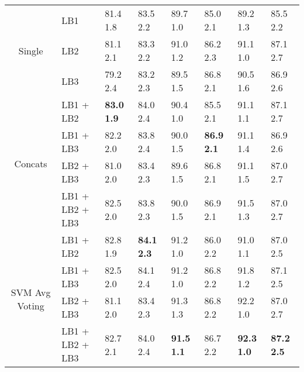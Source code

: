 \documentclass[10pt,journal,compsoc]{IEEEtran}
\begin{document}
\begin{table}[!b]
\begin{adjustbox}{width=\columnwidth}
\begin{tabular}{cl|ll|ll|ll|}
\multicolumn{1}{|c|}{\multirow{3}{*}{Single}}         & LB1             &  81.4  1.8	&83.5  2.2	&89.7  1.0	&85.0  2.1	&89.2  1.3	&85.5  2.2   \\
\multicolumn{1}{|c|}{}                                & LB2             &  81.1  2.1	&83.3  2.2	&91.0  1.2	&86.2  2.3	&91.1  1.0	&87.1  2.7   \\
\multicolumn{1}{|c|}{}                                & LB3             &  79.2  2.4	&83.2  2.3	&89.5  1.5	&86.8  2.1	&90.5  1.6	&86.9  2.6   \\ \hline
\multicolumn{1}{|c|}{\multirow{4}{*}{Concats}}        & LB1 + LB2       &  \textbf{83.0  1.9}	&84.0  2.4	&90.4  1.0	&85.5  2.1	&91.1  1.1	&87.1  2.7   \\
\multicolumn{1}{|c|}{}                                & LB1 + LB3       &  82.2  2.0	&83.8  2.4	&90.0  1.5	&\textbf{86.9  2.1}	&91.1  1.4	&86.9  2.6   \\
\multicolumn{1}{|c|}{}                                & LB2 + LB3       &  81.0  2.0	&83.4  2.3	&89.6  1.5	&86.8  2.1	&91.1  1.5	&87.0  2.7   \\
\multicolumn{1}{|c|}{}                                & LB1 + LB2 + LB3 &  82.5  2.0	&83.8  2.3	&90.0  1.5	&86.9  2.1	&91.5  1.3	&87.0  2.7   \\ \hline
\multicolumn{1}{|c|}{\multirow{4}{*}{SVM Avg Voting}} & LB1 + LB2       &  82.8  1.9	&\textbf{84.1  2.3}	&91.2  1.0	&86.0  2.2	&91.0  1.1	&87.0  2.5   \\
\multicolumn{1}{|c|}{}                                & LB1 + LB3       &  82.5  2.0	&84.1  2.4	&91.2  1.0	&86.8  2.2	&91.8  1.2	&87.1  2.5   \\
\multicolumn{1}{|c|}{}                                & LB2 + LB3       &  81.1  2.0	&83.4  2.3	&91.3  1.3	&86.8  2.2	&92.2  1.0	&87.0  2.7   \\
\multicolumn{1}{|c|}{}                                & LB1 + LB2 + LB3 &  82.7  2.1	&84.0  2.4	&\textbf{91.5  1.1}	&86.7  2.2	&\textbf{92.3  1.0}	&\textbf{87.2  2.5}   \\ \hline
\end{tabular}
\end{adjustbox}
\end{table}
\end{document}
